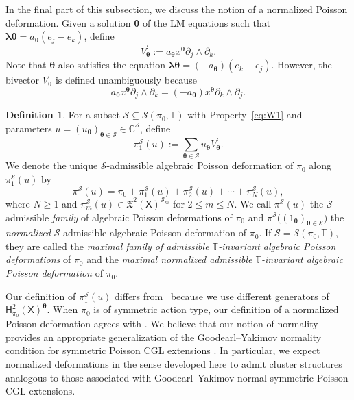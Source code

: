 \documentclass[11pt]{article}
\newcommand{\blambda}{\boldsymbol{\lambda}}
\newcommand{\btheta}{{\boldsymbol{\theta}}}
\theoremstyle{definition}\newtheorem{definition}[theorem]{Definition}
\theoremstyle{definition}\newtheorem{remark}[theorem]{Remark}
\theoremstyle{remark}
\numberwithin{equation}{section}
\begin{document}
In the final part of this subsection, we discuss the notion of a normalized Poisson deformation. Given a solution $\btheta$ of the LM equations such that $\blambda \btheta = a_{\btheta}(e_j-e_k)$, define
\begin{equation}\label{eq:Vprime}
    V_\btheta^{\prime}:={a_\btheta}x^\btheta \partial_j \wedge \partial_k.
\end{equation}
Note that $\btheta$ also satisfies the equation $\blambda \btheta = (-a_{\btheta})(e_k-e_j)$. However, the bivector $V_{\btheta}^\prime$ is defined unambiguously because
\begin{equation*}
    a_\btheta x^\btheta \partial_j \wedge \partial_k = (-a_\btheta)x^\btheta \partial_k \wedge \partial_j.
\end{equation*}

\begin{definition}
For a subset $\mathcal{S}\subseteq \mathcal{S}(\pi_0,\mathbb{T})$ with Property~\eqref{eq:W1} and parameters $u = (u_{\btheta})_{\btheta \in \mathcal{S}} \in \mathbb{C}^{\mathcal{S}}$, define
\begin{equation*}\label{eq:pi1s}
    \pi_1^{\mathcal{S}}(u) := \sum_{\btheta \in \mathcal{S}} u_{\btheta} V_{\btheta}^\prime.
\end{equation*}
We denote the unique $\mathcal{S}$-admissible algebraic Poisson deformation of $\pi_0$ along $\pi_1^{\mathcal{S}}(u)$ by
\begin{equation}\label{eq:pi-S-c}
\pi^{\mathcal{S}}(u)
=
\pi_0+\pi_1^{\mathcal{S}}(u)+\pi_2^{\mathcal{S}}(u)+\cdots+\pi_N^{\mathcal{S}}(u),
\end{equation}
where $N\geq 1$ and
$\pi_m^{\mathcal{S}}(u)\in
\mathfrak{X}^2(\mathsf{X})^{\mathcal{S}_m}$
for $2\leq m\leq N$.
We call
$\pi^{\mathcal{S}}(u)$ the
\(\mathcal{S}\)-admissible \emph{family} of algebraic Poisson deformations of \(\pi_0\) and
\(
\pi^{\mathcal{S}}
\bigl(
(1_{\btheta})_{\boldsymbol{\theta}\in\mathcal{S}}
\bigr)
\)
the \emph{normalized}
\(\mathcal{S}\)-admissible algebraic Poisson deformation of \(\pi_0\). If $\mathcal{S} = \mathcal{S}(\pi_0,\mathbb{T})$, they are called 
the \emph{maximal family of admissible $\mathbb{T}$-invariant algebraic Poisson deformations} of \(\pi_0\) and
the \emph{maximal normalized admissible $\mathbb{T}$-invariant algebraic Poisson deformation} of \(\pi_0\).
\end{definition}

Our definition of $\pi_1^{\mathcal{S}}(u)$ differs from~\cite[Notation 3.3.6]{lm-deform} because we use different generators of $\mathsf{H}_{\pi_0}^{2}(\mathsf{X})^{\btheta}$. When $\pi_0$ is of symmetric action type, our definition of a normalized Poisson deformation agrees with \cite[Definition 4.4.5]{lm-deform}. We believe that our notion of normality provides an appropriate generalization of the Goodearl--Yakimov normality condition for symmetric Poisson CGL extensions \cite{lm-deform,gy-cgl}. In particular, we expect normalized deformations in the sense developed here to admit cluster structures analogous to those associated with Goodearl--Yakimov normal symmetric Poisson CGL extensions.
\end{document}
